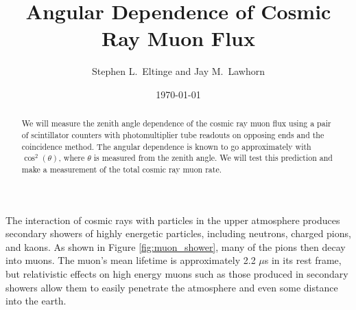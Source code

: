 \usepackage{lgrind} %
\usepackage{chapterbib} %
\usepackage{color} %
\usepackage{graphics}      %
\usepackage[pdftex]{graphicx} %
\usepackage{longtable}     %
\usepackage{epsf} %
\usepackage{bm}            %
\usepackage{thumbpdf}
\usepackage[colorlinks=true]{hyperref} %
\usepackage{multirow}
\usepackage{subfigure}

\newcommand{\cd}{$\cdot$}

%
%


\title{Angular Dependence of Cosmic Ray Muon Flux}
\author{Stephen L.\ Eltinge and Jay M.\ Lawhorn}
\date{\today}

\begin{abstract}
We will measure the zenith angle dependence of the cosmic ray muon flux using a pair of scintillator counters with photomultiplier tube readouts on opposing ends and the coincidence method. The angular dependence is known to go approximately with $\cos^2(\theta)$, where $\theta$ is measured from the zenith angle. We will test this prediction and make a measurement of the total cosmic ray muon rate.
\end{abstract}

\maketitle

The interaction of cosmic rays with particles in the upper atmosphere produces secondary showers of highly energetic particles, including neutrons, charged pions, and kaons. As shown in Figure \ref{fig:muon_shower}, many of the pions then decay into muons. The muon's mean lifetime is approximately 2.2 $\mu$s in its rest frame, but relativistic effects on high energy muons such as those produced in secondary showers allow them to easily penetrate the atmosphere and even some distance into the earth.

